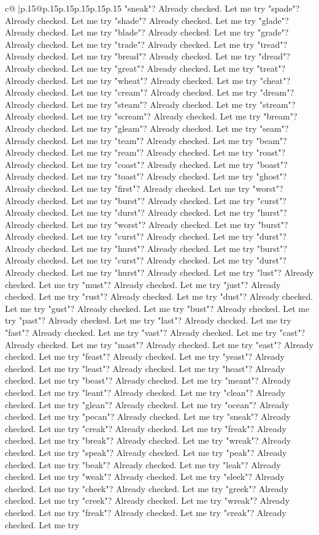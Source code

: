 \documentclass{article}
\begin{document}
{\begin{supertabular}{c@{$\;$}|p{.15\linewidth}@{}p{.15\linewidth}p{.15\linewidth}p{.15\linewidth}p{.15\linewidth}p{.15\linewidth}}
{{{"sneak"? Already checked. Let me try "spade"? Already checked. Let me try "shade"? Already checked. Let me try "glade"? Already checked. Let me try "blade"? Already checked. Let me try "grade"? Already checked. Let me try "trade"? Already checked. Let me try "tread"? Already checked. Let me try "bread"? Already checked. Let me try "dread"? Already checked. Let me try "great"? Already checked. Let me try "treat"? Already checked. Let me try "wheat"? Already checked. Let me try "cheat"? Already checked. Let me try "cream"? Already checked. Let me try "dream"? Already checked. Let me try "steam"? Already checked. Let me try "stream"? Already checked. Let me try "scream"? Already checked. Let me try "bream"? Already checked. Let me try "gleam"? Already checked. Let me try "seam"? Already checked. Let me try "team"? Already checked. Let me try "beam"? Already checked. Let me try "ream"? Already checked. Let me try "roast"? Already checked. Let me try "coast"? Already checked. Let me try "boast"? Already checked. Let me try "toast"? Already checked. Let me try "ghost"? Already checked. Let me try "first"? Already checked. Let me try "worst"? Already checked. Let me try "burst"? Already checked. Let me try "curst"? Already checked. Let me try "durst"? Already checked. Let me try "hurst"? Already checked. Let me try "worst"? Already checked. Let me try "burst"? Already checked. Let me try "curst"? Already checked. Let me try "durst"? Already checked. Let me try "hurst"? Already checked. Let me try "burst"? Already checked. Let me try "curst"? Already checked. Let me try "durst"? Already checked. Let me try "hurst"? Already checked. Let me try "lust"? Already checked. Let me try "must"? Already checked. Let me try "just"? Already checked. Let me try "rust"? Already checked. Let me try "dust"? Already checked. Let me try "gust"? Already checked. Let me try "bust"? Already checked. Let me try "past"? Already checked. Let me try "last"? Already checked. Let me try "fast"? Already checked. Let me try "vast"? Already checked. Let me try "cast"? Already checked. Let me try "mast"? Already checked. Let me try "east"? Already checked. Let me try "feast"? Already checked. Let me try "yeast"? Already checked. Let me try "least"? Already checked. Let me try "heast"? Already checked. Let me try "beast"? Already checked. Let me try "meant"? Already checked. Let me try "leant"? Already checked. Let me try "clean"? Already checked. Let me try "glean"? Already checked. Let me try "ocean"? Already checked. Let me try "pecan"? Already checked. Let me try "sneak"? Already checked. Let me try "creak"? Already checked. Let me try "freak"? Already checked. Let me try "break"? Already checked. Let me try "wreak"? Already checked. Let me try "speak"? Already checked. Let me try "peak"? Already checked. Let me try "beak"? Already checked. Let me try "leak"? Already checked. Let me try "weak"? Already checked. Let me try "sleek"? Already checked. Let me try "cheek"? Already checked. Let me try "greek"? Already checked. Let me try "creek"? Already checked. Let me try "wreak"? Already checked. Let me try "freak"? Already checked. Let me try "creak"? Already checked. Let me try }}}
\end{supertabular}}
\end{document}
